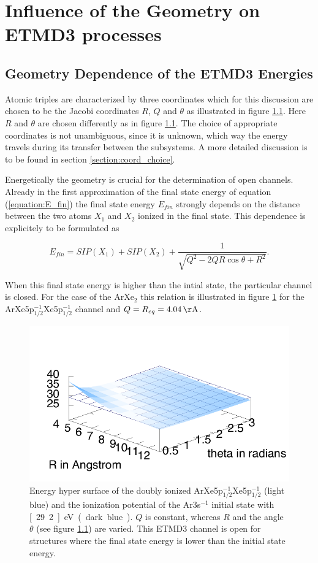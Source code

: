 \section{Influence of the Geometry on ETMD3 processes}
\subsection{Geometry Dependence of the ETMD3 Energies}
Atomic triples are characterized by three coordinates which for this
discussion are chosen to be the Jacobi coordinates
$R$, $Q$ and $\theta$ as illustrated
in figure \ref{}. Here $R$ and $\theta$ are chosen differently as in
figure \ref{}. The choice of appropriate coordinates is not unambiguous,
since it is unknown, which way the energy travels during its transfer
between the subsystems. A more detailed discussion is to be found in 
section \ref{section:coord_choice}.


Energetically the geometry is crucial for the determination of open channels.
Already in the first approximation of the final state energy of equation
(\ref{equation:E_fin})
the final state energy $E_{fin}$ strongly depends on the distance between the
two atoms $X_1$ and $X_2$ ionized in the final state. This dependence is explicitely to be
formulated as

\begin{equation}
  E_{fin} = SIP(X_1) + SIP(X_2) + \frac{1}{\sqrt{Q^2 - 2QR\cos\theta + R^2}} .
\end{equation}

When this final state energy is higher than the intial state, the particular
channel is closed. For the case of the ArXe$_2$ this relation is illustrated
in figure \ref{figure:ArXe2_geom_energy} for the
ArXe5p$_{1/2}^{-1}$Xe5p$_{1/2}^{-1}$ channel and $Q=R_{eq}= \unit[4.04]{\AA}$.

\begin{figure}[htb]
 \centering
 \includegraphics[scale=0.8]{pics/ArXeXe12_12_surf.pdf}
 \caption{Energy hyper surface of the doubly ionized
          ArXe5p$_{1/2}^{-1}$Xe5p$_{1/2}^{-1}$ (light blue) and the ionization
          potential of the Ar3s$^{-1}$ initial state with \unit[29.2]{eV}
          (dark blue). $Q$ is constant, whereas $R$ and the angle $\theta$
          (see figure \ref{}) are varied. This ETMD3 channel is open for
          structures where
          the final state energy is lower than the initial state energy.}
 \label{figure:ArXe2_geom_energy}
\end{figure}

